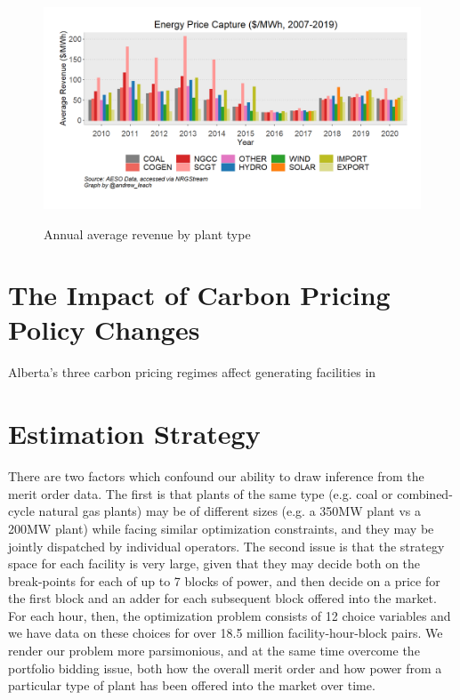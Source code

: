 \documentclass[12pt]{article}
\begin{document}
\begin{figure}[!h]%
	\centering \vspace{-.25cm} \includegraphics[width=6.5in]{../images/price_capture.png}
\label{fig:capture_prices}
\vspace{-0.75cm}	\caption{Annual average revenue by plant type}
\end{figure}


\section{The Impact of Carbon Pricing Policy Changes}

Alberta's three carbon pricing regimes affect generating facilities in 




\section{Estimation Strategy}
There are two factors which confound our ability to draw inference from the merit order data. The first is that plants of the same type (e.g. coal or combined-cycle natural gas plants) may be of different sizes (e.g. a 350MW plant vs a 200MW plant) while facing similar optimization constraints, and they may be jointly dispatched by individual operators. The second issue is that the strategy space for each facility is very large, given that they may decide both on the break-points for each of up to 7 blocks of power, and then decide on a price for the first block and an adder for each subsequent block offered into the market. For each hour, then, the optimization problem consists of 12 choice variables and we have data on these choices for over 18.5 million facility-hour-block pairs. We render our problem more parsimonious, and at the same time overcome the portfolio bidding issue, both how the overall merit order and how power from a particular type of plant has been offered into the market over time.
\end{document}
